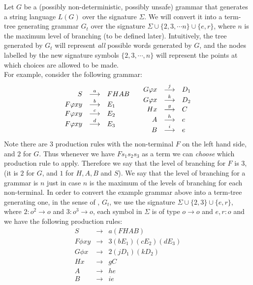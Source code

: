 Let $G$ be a (possibly non-deterministic, possibly unsafe) grammar
that generates a string language $L(G)$ over the signature
$\Sigma$. We will convert it into a term-tree generating grammar
$G_t$ over the signature $\Sigma \cup \{2,3, \cdots n\} \cup
\{e,r\}$, where $n$ is the maximum level of branching (to be
defined later). Intuitively, the tree generated by $G_t$ will
represent \emph{all} possible words generated by $G$, and the
nodes labelled by the new signature symbols $\{2,3, \cdots, n\}$
will
represent the points at which choices are allowed to be made.\\
For example, consider the following grammar:
\begin{eqnarray}
\begin{array}{ll}
\begin{array}{rcl}
\nonumber S & \stackrel{{a}}{\longrightarrow} & FHAB \\
\nonumber F\varphi x y & \stackrel{{b}}{\longrightarrow} & E_1\\
\nonumber F\varphi x y & \stackrel{{c}}{\longrightarrow} & E_2 \\
\nonumber F\varphi x y & \stackrel{{d}}{\longrightarrow} & E_3 \\
\end{array} &
\begin{array}{rcl}
\nonumber G \varphi x & \stackrel{{j}}{\longrightarrow} & D_1\\
\nonumber G \varphi x & \stackrel{{k}}{\longrightarrow} & D_2\\
\nonumber H x & \stackrel{{g}}{\longrightarrow} & C \\
\nonumber A & \stackrel{{h}}{\longrightarrow} & e\\
\nonumber B & \stackrel{{i}}{\longrightarrow} & e
\end{array}
\end{array}
\end{eqnarray}
Note there are $3$ production rules with the non-terminal $F$ on
the left hand side, and $2$ for $G$. Thus whenever we have $F s_1
s_2 s_3$ as a term we can \emph{choose} which production rule to
apply. Therefore we say that the level of branching for $F$ is
$3$, (it is $2$ for $G$, and $1$ for $H, A, B$ and $S$). We say
that the level of branching for a grammar is $n$ just in case $n$
is the maximum of the levels of branching for each non-terminal.
In order to convert the example grammar above into a term-tree
generating one, in the sense of \cite{KNU01, KNU02}, $G_t$, we use
the signature $\Sigma \cup \{2,3\} \cup \{e,r\}$, where $2: o^2
\rightarrow o$ and $3: o^3 \rightarrow o$, each symbol in $\Sigma$
is of type $o \rightarrow o$ and $e,r : o$ and we have the
following production rules:
\begin{eqnarray}
\nonumber S & \rightarrow & a(FHAB) \\
\nonumber F \phi x y &\rightarrow  & 3 (bE_1)(c E_2)( dE_3) \\
\nonumber G \phi x & \rightarrow & 2 (jD_1) (kD_2)\\
\nonumber H x & \rightarrow & gC\\
\nonumber A & \rightarrow & he\\
\nonumber B & \rightarrow & ie
\end{eqnarray}
